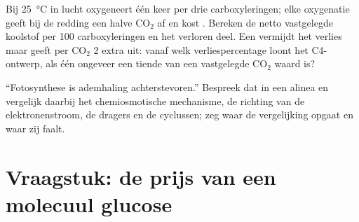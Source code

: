 \begin{exercise}[$\star\star\star$]\label{exo:b1:photosynthesis:11}
Bij \qty{25}{\celsius} in lucht oxygeneert  één keer per drie
carboxyleringen; elke oxygenatie geeft bij de redding een halve $\mathrm{CO_2}$ af
en kost . Bereken de netto vastgelegde koolstof per 100 carboxyleringen en het
verloren deel. Een  vermijdt het verlies maar geeft per $\mathrm{CO_2}$ 2
extra  uit: vanaf welk verliespercentage loont het C4-ontwerp, als één 
ongeveer een tiende van een vastgelegde $\mathrm{CO_2}$ waard is?
\end{exercise}

\begin{exercise}[$\star\star\star$]\label{exo:b1:photosynthesis:12}
``Fotosynthese is ademhaling achterstevoren.'' Bespreek dat in een alinea en
vergelijk daarbij het chemiosmotische mechanisme, de richting van de
elektronenstroom, de dragers en de cyclussen; zeg waar de vergelijking opgaat en
waar zij faalt.
\end{exercise}

\section{Vraagstuk: de prijs van een molecuul glucose}

